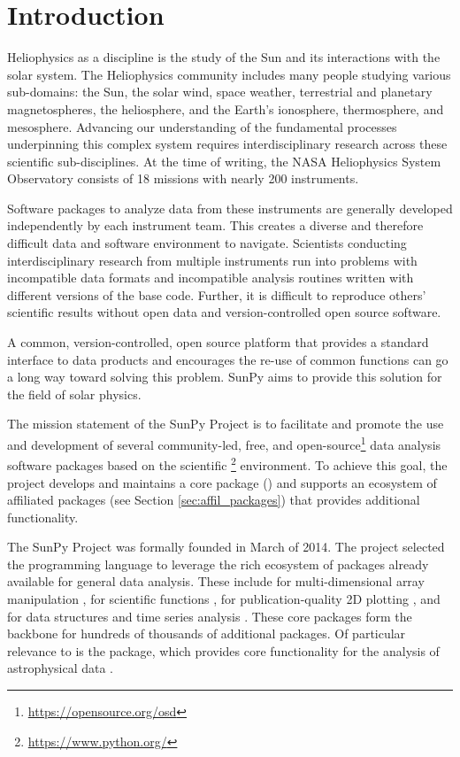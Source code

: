 \section{Introduction}
\label{sec:intro}

Heliophysics as a discipline is the study of the Sun and its interactions with the solar system. 
The Heliophysics community includes many people studying various sub-domains: the Sun, the solar wind, space weather, terrestrial and planetary magnetospheres, the heliosphere, and the Earth's ionosphere, thermosphere, and mesosphere.  
Advancing our understanding of the fundamental processes underpinning this complex system requires interdisciplinary research across these scientific sub-disciplines.
At the time of writing, the NASA Heliophysics System Observatory consists of 18 missions with nearly 200 instruments.

Software packages to analyze data from these instruments are generally developed independently by each instrument team. 
This creates a diverse and therefore difficult data and software environment to navigate. 
Scientists conducting interdisciplinary research from multiple instruments run into problems with incompatible data formats and incompatible analysis routines written with different versions of the base code. Further, it is difficult to reproduce others' scientific results without open data and version-controlled open source software.

A common, version-controlled, open source platform that provides a standard interface to data products and encourages the re-use of common functions can go a long way toward solving this problem. 
SunPy aims to provide this solution for the field of solar physics.

The mission statement of the SunPy Project is to facilitate and promote the use and development of several community-led, free, and open-source\footnote{\url{https://opensource.org/osd}} data analysis software packages based on the scientific \python\footnote{\url{https://www.python.org/}} environment.
To achieve this goal, the project develops and maintains a core package (\sunpypkg) and supports an ecosystem of affiliated packages (see Section \ref{sec:affil_packages}) that provides additional functionality. 

The SunPy Project was formally founded in March of 2014. The project selected the \python programming language to leverage the rich ecosystem of packages already available for general data analysis. 
These include  for multi-dimensional array manipulation \citep{numpy},  for scientific functions \citep{scipy},  for publication-quality 2D plotting \citep{matplotlib}, and  for data structures and time series analysis \citep{pandas}.
These core packages form the backbone for hundreds of thousands of additional \python packages.
Of particular relevance to \sunpypkg is the \astropypkg package, which provides core functionality for the analysis of astrophysical data \citep{astropy2018}. 

